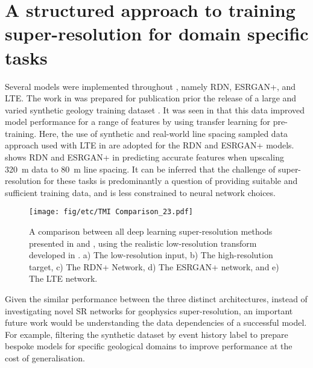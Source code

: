 \section[Super-resolution for domain specific tasks]{A structured approach to training super-resolution for domain specific tasks}
Several models were implemented throughout , namely RDN\textdaggerdbl{}, ESRGAN+, and LTE\@.
The work in  was prepared for publication prior the release of a large and varied synthetic geology training dataset \parencite{jessellNoddyverseMassiveData2022}.
It was seen in  that this data improved model performance for a range of features by using transfer learning for pre-training.
Here, the use of synthetic and real-world line spacing sampled data approach used with LTE in  are adopted for the RDN\textdaggerdbl{} and ESRGAN+ models.
 shows RDN\textdaggerdbl{} and ESRGAN+ in predicting accurate features when upscaling \qty{320}{\m} data to \qty{80}{\m} line spacing.
It can be inferred that the challenge of super-resolution for these tasks is predominantly a question of providing suitable and sufficient training data, and is less constrained to neural network choices.

\begin{figure}
    \texttt{[image: fig/etc/TMI Comparison\_23.pdf]} %
    \caption{
        A comparison between all deep learning super-resolution methods presented in  and , using the realistic low-resolution transform developed in .
        a) The low-resolution input, b) The high-resolution target, c) The RDN\textdaggerdbl{}+ Network, d) The ESRGAN+ network, and e) The LTE network.}
    \label{fig:modcomp}
\end{figure}

Given the similar performance between the three distinct architectures, instead of investigating novel SR networks for geophysics super-resolution, an important future work would be understanding the data dependencies of a successful model. For example, filtering the synthetic dataset by event history label to prepare bespoke models for specific geological domains to improve performance at the cost of generalisation.

